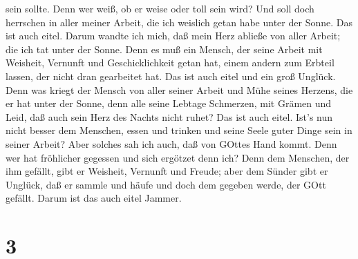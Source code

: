 sein sollte.  Denn wer weiß, ob er weise oder toll sein
wird? Und soll doch herrschen in aller meiner Arbeit, die ich weislich
getan habe unter der Sonne. Das ist auch eitel.  Darum
wandte ich mich, daß mein Herz abließe von aller Arbeit; die ich tat
unter der Sonne.  Denn es muß ein Mensch, der seine Arbeit
mit Weisheit, Vernunft und Geschicklichkeit getan hat, einem andern zum
Erbteil lassen, der nicht dran gearbeitet hat. Das ist auch eitel und
ein groß Unglück.  Denn was kriegt der Mensch von aller
seiner Arbeit und Mühe seines Herzens, die er hat unter der Sonne,
 denn alle seine Lebtage Schmerzen, mit Grämen und Leid,
daß auch sein Herz des Nachts nicht ruhet? Das ist auch eitel.
 Ist's nun nicht besser dem Menschen, essen und trinken und
seine Seele guter Dinge sein in seiner Arbeit? Aber solches sah ich
auch, daß von GOttes Hand kommt.  Denn wer hat fröhlicher
gegessen und sich ergötzet denn ich?  Denn dem Menschen,
der ihm gefällt, gibt er Weisheit, Vernunft und Freude; aber dem Sünder
gibt er Unglück, daß er sammle und häufe und doch dem gegeben werde, der
GOtt gefällt. Darum ist das auch eitel Jammer.

\hypertarget{section-2}{%
\section{3}\label{section-2}}

